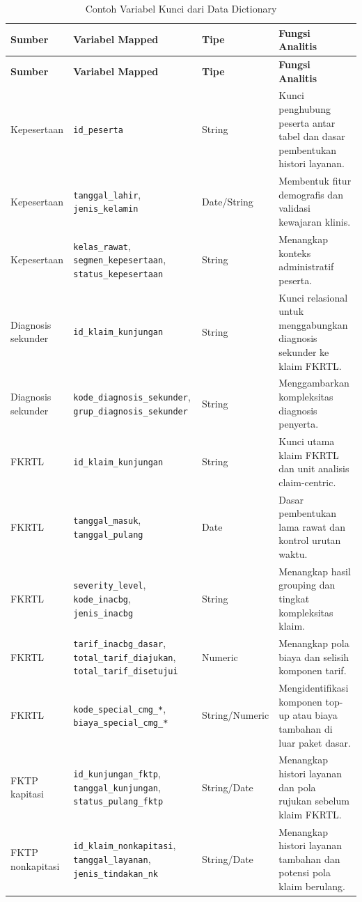 \begin{longtable}[]{@{}p{}p{}p{}p{}@{}}
\caption{Contoh Variabel Kunci dari Data Dictionary}\label{tab:lampiran-variabel-kunci}\\
\toprule
\textbf{Sumber} & \textbf{Variabel Mapped} & \textbf{Tipe} & \textbf{Fungsi Analitis} \\
\midrule
\endfirsthead
\toprule
\textbf{Sumber} & \textbf{Variabel Mapped} & \textbf{Tipe} & \textbf{Fungsi Analitis} \\
\midrule
\endhead
\bottomrule
\endfoot
Kepesertaan & \texttt{id\_peserta} & String & Kunci penghubung peserta antar tabel dan dasar pembentukan histori layanan. \\
Kepesertaan & \texttt{tanggal\_lahir}, \texttt{jenis\_kelamin} & Date/String & Membentuk fitur demografis dan validasi kewajaran klinis. \\
Kepesertaan & \texttt{kelas\_rawat}, \texttt{segmen\_kepesertaan}, \texttt{status\_kepesertaan} & String & Menangkap konteks administratif peserta. \\
Diagnosis sekunder & \texttt{id\_klaim\_kunjungan} & String & Kunci relasional untuk menggabungkan diagnosis sekunder ke klaim FKRTL. \\
Diagnosis sekunder & \texttt{kode\_diagnosis\_sekunder}, \texttt{grup\_diagnosis\_sekunder} & String & Menggambarkan kompleksitas diagnosis penyerta. \\
FKRTL & \texttt{id\_klaim\_kunjungan} & String & Kunci utama klaim FKRTL dan unit analisis claim-centric. \\
FKRTL & \texttt{tanggal\_masuk}, \texttt{tanggal\_pulang} & Date & Dasar pembentukan lama rawat dan kontrol urutan waktu. \\
FKRTL & \texttt{severity\_level}, \texttt{kode\_inacbg}, \texttt{jenis\_inacbg} & String & Menangkap hasil grouping dan tingkat kompleksitas klaim. \\
FKRTL & \texttt{tarif\_inacbg\_dasar}, \texttt{total\_tarif\_diajukan}, \texttt{total\_tarif\_disetujui} & Numeric & Menangkap pola biaya dan selisih komponen tarif. \\
FKRTL & \texttt{kode\_special\_cmg\_*}, \texttt{biaya\_special\_cmg\_*} & String/Numeric & Mengidentifikasi komponen top-up atau biaya tambahan di luar paket dasar. \\
FKTP kapitasi & \texttt{id\_kunjungan\_fktp}, \texttt{tanggal\_kunjungan}, \texttt{status\_pulang\_fktp} & String/Date & Menangkap histori layanan dan pola rujukan sebelum klaim FKRTL. \\
FKTP nonkapitasi & \texttt{id\_klaim\_nonkapitasi}, \texttt{tanggal\_layanan}, \texttt{jenis\_tindakan\_nk} & String/Date & Menangkap histori layanan tambahan dan potensi pola klaim berulang. \\
\end{longtable}

